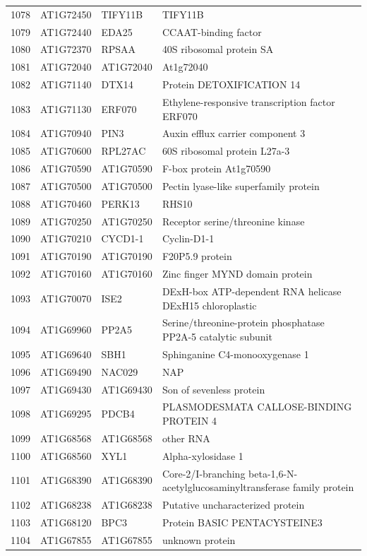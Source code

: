 \documentclass[11pt]{article}
\begin{document}
\begin{center}
\begin{tabular}{rlll}
1078 & AT1G72450 & TIFY11B & TIFY11B\\
1079 & AT1G72440 & EDA25 & CCAAT-binding factor\\
1080 & AT1G72370 & RPSAA & 40S ribosomal protein SA\\
1081 & AT1G72040 & AT1G72040 & At1g72040\\
1082 & AT1G71140 & DTX14 & Protein DETOXIFICATION 14\\
1083 & AT1G71130 & ERF070 & Ethylene-responsive transcription factor ERF070\\
1084 & AT1G70940 & PIN3 & Auxin efflux carrier component 3\\
1085 & AT1G70600 & RPL27AC & 60S ribosomal protein L27a-3\\
1086 & AT1G70590 & AT1G70590 & F-box protein At1g70590\\
1087 & AT1G70500 & AT1G70500 & Pectin lyase-like superfamily protein\\
1088 & AT1G70460 & PERK13 & RHS10\\
1089 & AT1G70250 & AT1G70250 & Receptor serine/threonine kinase\\
1090 & AT1G70210 & CYCD1-1 & Cyclin-D1-1\\
1091 & AT1G70190 & AT1G70190 & F20P5.9 protein\\
1092 & AT1G70160 & AT1G70160 & Zinc finger MYND domain protein\\
1093 & AT1G70070 & ISE2 & DExH-box ATP-dependent RNA helicase DExH15 chloroplastic\\
1094 & AT1G69960 & PP2A5 & Serine/threonine-protein phosphatase PP2A-5 catalytic subunit\\
1095 & AT1G69640 & SBH1 & Sphinganine C4-monooxygenase 1\\
1096 & AT1G69490 & NAC029 & NAP\\
1097 & AT1G69430 & AT1G69430 & Son of sevenless protein\\
1098 & AT1G69295 & PDCB4 & PLASMODESMATA CALLOSE-BINDING PROTEIN 4\\
1099 & AT1G68568 & AT1G68568 & other RNA\\
1100 & AT1G68560 & XYL1 & Alpha-xylosidase 1\\
1101 & AT1G68390 & AT1G68390 & Core-2/I-branching beta-1,6-N-acetylglucosaminyltransferase family protein\\
1102 & AT1G68238 & AT1G68238 & Putative uncharacterized protein\\
1103 & AT1G68120 & BPC3 & Protein BASIC PENTACYSTEINE3\\
1104 & AT1G67855 & AT1G67855 & unknown protein\\

\end{tabular}
\end{center}
\end{document}
